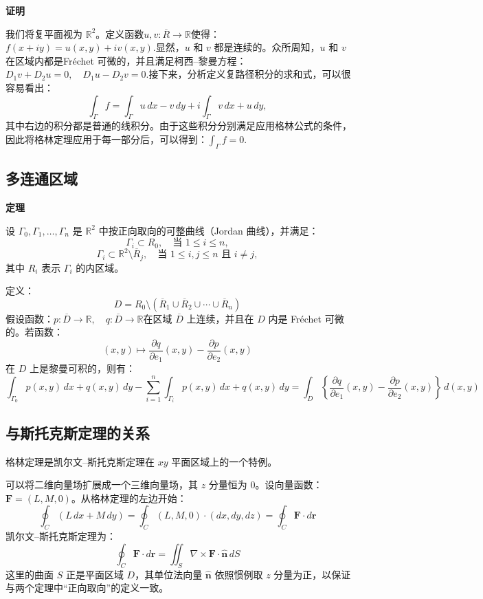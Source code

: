 \textbf{证明}

我们将复平面视为 $\mathbb{R}^2$。定义函数$u, v : \overline{R} \to \mathbb{R}$使得：$f(x + iy) = u(x, y) + i v(x, y)$.显然，$u$ 和 $v$ 都是连续的。众所周知，$u$ 和 $v$ 在区域内都是Fréchet 可微的，并且满足柯西–黎曼方程：$D_1 v + D_2 u = 0, \quad D_1 u - D_2 v = 0$.接下来，分析定义复路径积分的求和式，可以很容易看出：
$$
\int_{\Gamma} f 
= \int_{\Gamma} u \, dx - v \, dy
+ i \int_{\Gamma} v \, dx + u \, dy,~
$$
其中右边的积分都是普通的线积分。由于这些积分分别满足应用格林公式的条件，因此将格林定理应用于每一部分后，可以得到：$\int_{\Gamma} f = 0$.
\subsection{多连通区域}
\textbf{定理}

设 $\Gamma_0, \Gamma_1, \ldots, \Gamma_n$ 是 $\mathbb{R}^2$ 中按正向取向的可整曲线（Jordan 曲线），并满足：
$$
\Gamma_i \subset R_0, \quad \text{当 } 1 \leq i \leq n,~
$$
$$
\Gamma_i \subset \mathbb{R}^2 \setminus \overline{R}_j, \quad \text{当 } 1 \leq i, j \leq n \text{ 且 } i \neq j,~
$$
其中 $R_i$ 表示 $\Gamma_i$ 的内区域。

定义：
$$
D = R_0 \setminus (\overline{R}_1 \cup \overline{R}_2 \cup \cdots \cup \overline{R}_n)~
$$
假设函数：$p: \overline{D} \to \mathbb{R}, \quad q: \overline{D} \to \mathbb{R}$在区域 $\overline{D}$ 上连续，并且在 $D$ 内是 Fréchet 可微的。若函数：
$$
(x, y) \longmapsto 
\frac{\partial q}{\partial e_1}(x, y) - 
\frac{\partial p}{\partial e_2}(x, y)~
$$
在 $D$ 上是黎曼可积的，则有：
$$
\int_{\Gamma_0} p(x, y)\,dx + q(x, y)\,dy
-
\sum_{i=1}^n 
\int_{\Gamma_i} p(x, y)\,dx + q(x, y)\,dy
=
\int_D
\left\{
\frac{\partial q}{\partial e_1}(x, y)
-
\frac{\partial p}{\partial e_2}(x, y)
\right\}
\, d(x, y)~
$$
\subsection{与斯托克斯定理的关系}
格林定理是凯尔文–斯托克斯定理在 $xy$ 平面区域上的一个特例。

可以将二维向量场扩展成一个三维向量场，其 $z$ 分量恒为 $0$。设向量函数：$\mathbf{F} = (L, M, 0)$。从格林定理的左边开始：
$$
\oint_C (L\,dx + M\,dy)
= \oint_C (L, M, 0) \cdot (dx, dy, dz)
= \oint_C \mathbf{F} \cdot d\mathbf{r}~
$$
凯尔文–斯托克斯定理为：
$$
\oint_C \mathbf{F} \cdot d\mathbf{r} 
= \iint_S \nabla \times \mathbf{F} \cdot \mathbf{\hat{n}} \, dS~
$$
这里的曲面 $S$ 正是平面区域 $D$，其单位法向量 $\mathbf{\hat{n}}$ 依照惯例取 $z$ 分量为正，以保证与两个定理中“正向取向”的定义一致。

